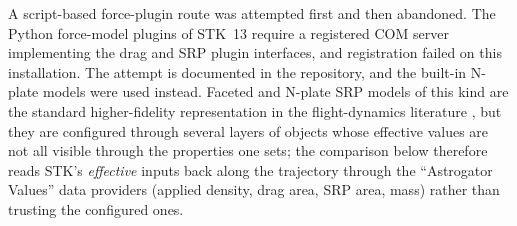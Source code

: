 \vspace{5pt}
\par\noindent A script-based force-plugin route was attempted first and then abandoned. The Python force-model plugins of STK~13 require a registered COM server implementing the drag and SRP plugin interfaces, and registration failed on this installation. The attempt is documented in the repository, and the built-in N-plate models were used instead. Faceted and N-plate SRP models of this kind are the standard higher-fidelity representation in the flight-dynamics literature \citep{ziebartGeneralizedSRP2004,ziebartDarePixelArray2001,rodriguezsolanoBoxWing2012,vielbergRadiationPressure2020}, but they are configured through several layers of objects whose effective values are not all visible through the properties one sets; the comparison below therefore reads STK's \emph{effective} inputs back along the trajectory through the ``Astrogator Values'' data providers (applied density, drag area, SRP area, mass) rather than trusting the configured ones.

